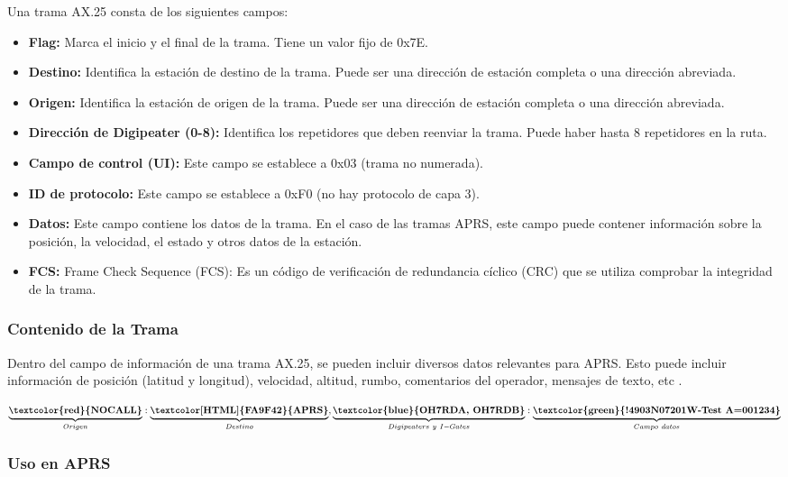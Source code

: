 Una trama AX.25 consta de los siguientes campos:
\begin{itemize}
	\item \textbf{Flag:} Marca el inicio y el final de la trama. Tiene un valor fijo de 0x7E.
	\item \textbf{Destino:} Identifica la estación de destino de la trama. Puede ser una dirección de estación completa o una dirección abreviada.
	\item \textbf{Origen:} Identifica la estación de origen de la trama. Puede ser una dirección de estación completa o una dirección abreviada.
	\item \textbf{Dirección de Digipeater (0-8):} Identifica los repetidores que deben reenviar la trama. Puede haber hasta 8 repetidores en la ruta.
	\item \textbf{Campo de control (UI):} Este campo se establece a 0x03 (trama no numerada).
	\item \textbf{ID de protocolo:} Este campo se establece a 0xF0 (no hay protocolo de capa 3).
	\item \textbf{Datos:} Este campo contiene los datos de la trama. En el caso de las tramas APRS, este campo puede contener información sobre la posición, la velocidad, el estado y otros datos de la estación.
	\item \textbf{FCS:} Frame Check Sequence (FCS): Es un código de verificación de redundancia cíclico (CRC) que se utiliza comprobar la integridad de la trama.
\end{itemize}


\subsubsection*{Contenido de la Trama}

Dentro del campo de información de una trama AX.25, se pueden incluir diversos datos relevantes para APRS. Esto puede incluir información de posición (latitud y longitud), velocidad, altitud, rumbo, comentarios del operador, mensajes de texto, etc \cite{APRSPaths}.

\[\underbrace{\textbf{\textcolor{red}{NOCALL}}}_{Origen}:\underbrace{\textbf{\textcolor[HTML]{FA9F42}{APRS}}}_{Destino}, \underbrace{\textbf{\textcolor{blue}{OH7RDA, OH7RDB}}}_{Digipeaters\ y\ I-Gates}:\underbrace{\textbf{\textcolor{green}{!4903N07201W-Test A=001234}}}_{Campo\ datos}\]

\subsubsection*{Uso en APRS}

